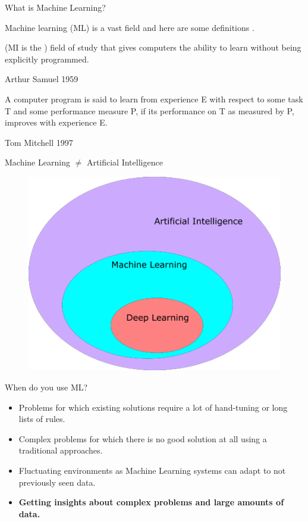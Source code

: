 \documentclass{beamer}
\begin{document}
\begin{frame}{What is Machine Learning?}

	Machine learning (ML) is a vast field and here are some definitions .
	
	(MI is the ) field of study that gives computers the ability to learn without being explicitly programmed.
	
	Arthur Samuel 1959
	
	A computer program is said to learn from experience E with respect to some task T and some performance measure P, if its performance on T as measured by P, improves with experience E.
	
	Tom Mitchell 1997

\end{frame}
\begin{frame}{Machine Learning $\ne$ Artificial Intelligence}	
	
	\begin{figure}[h]
	\centering
	\includegraphics[scale=0.55]{Figures/fig_ml_vs_ai.png}
\end{figure}
	
\end{frame}

\begin{frame}{When do you use ML?}
	\begin{itemize}
		\item Problems for which existing solutions require a lot of hand-tuning or long lists of rules.
		\item Complex problems for which there is no good solution at all using a traditional approaches.
		\item Fluctuating environments as Machine Learning systems can adapt to not previously seen data.
		\item \textbf{Getting insights about complex problems and large amounts of data.}	
	\end{itemize}

\end{frame}
	
\end{document}
